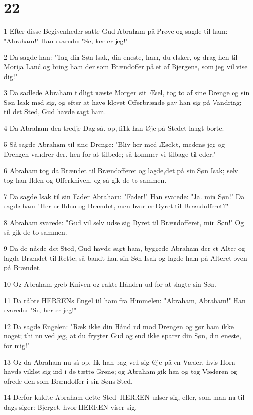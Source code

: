 \chapter{22}

\par 1 Efter disse Begivenheder satte Gud Abraham på Prøve og sagde til ham: "Abraham!" Han svarede: "Se, her er jeg!"
\par 2 Da sagde han: "Tag din Søn Isak, din eneste, ham, du elsker, og drag hen til Morija Land.og bring ham der som Brændoffer på et af Bjergene, som jeg vil vise dig!"
\par 3 Da sadlede Abraham tidligt næste Morgen sit Æsel, tog to af sine Drenge og sin Søn Isak med sig, og efter at have kløvet Offerbrænde gav han sig på Vandring; til det Sted, Gud havde sagt ham.
\par 4 Da Abraham den tredje Dag så. op, fi1k han Øje på Stedet langt borte.
\par 5 Så sagde Abraham til sine Drenge: "Bliv her med Æselet, medens jeg og Drengen vandrer der. hen for at tilbede; så kommer vi tilbage til eder."
\par 6 Abraham tog da Brændet til Brændofferet og lagde,det på sin Søn Isak; selv tog han Ilden og Offerkniven, og så gik de to sammen.
\par 7 Da sagde Isak til sin Fader Abraham: "Fader!" Han svarede: "Ja. min Søn!" Da sagde han: "Her er Ilden og Brændet, men hvor er Dyret til Brændofferet?"
\par 8 Abraham svarede: "Gud vil selv udse sig Dyret til Brændofferet, min Søn!" Og så gik de to sammen.
\par 9 Da de nåede det Sted, Gud havde sagt ham, byggede Abraham der et Alter og lagde Brændet til Rette; så bandt han sin Søn Isak og lagde ham på Alteret oven på Brændet.
\par 10 Og Abraham greb Kniven og rakte Hånden ud for at slagte sin Søn.
\par 11 Da råbte HERRENs Engel til ham fra Himmelen: "Abraham, Abraham!" Han svarede: "Se, her er jeg!"
\par 12 Da sagde Engelen: "Ræk ikke din Hånd ud mod Drengen og gør ham ikke noget; thi nu ved jeg, at du frygter Gud og end ikke sparer din Søn, din eneste, for mig!"
\par 13 Og da Abraham nu så op, fik han bag ved sig Øje på en Væder, hvis Horn havde viklet sig ind i de tætte Grene; og Abraham gik hen og tog Væderen og ofrede den som Brændoffer i sin Søns Sted.
\par 14 Derfor kaldte Abraham dette Sted: HERREN udser sig, eller, som man nu til dags siger: Bjerget, hvor HERREN viser sig.
